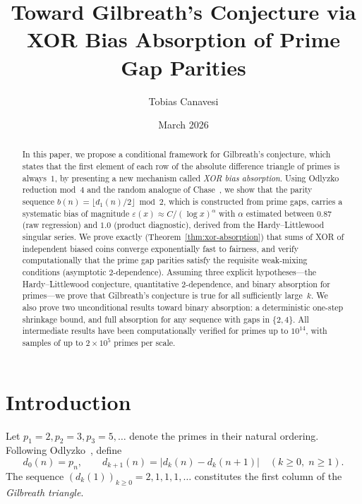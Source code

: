 \documentclass[11pt, a4paper]{amsart}
\title[Toward Gilbreath's Conjecture via XOR Bias Absorption]{%
Toward Gilbreath's Conjecture via\\ XOR Bias Absorption of Prime Gap Parities}
\author{Tobias Canavesi}
\date{March 2026}
\theoremstyle{plain}
\theoremstyle{definition}
\begin{document}
\begin{abstract}
In this paper, we propose a conditional framework for Gilbreath's conjecture, which states that the first element of each row of the absolute difference 
triangle of primes is always~$1$, by presenting a new mechanism called \emph{XOR bias absorption}. 
Using Odlyzko~\cite{Odlyzko1993} reduction mod~4 and the random analogue of Chase~\cite{Chase2020}, we show that the parity
sequence $b(n) = \lfloor d_1(n)/2 \rfloor \bmod 2$, which is constructed from prime gaps, carries a systematic bias of
magnitude $\varepsilon(x) \approx C/(\log x)^{\alpha}$ with $\alpha$ estimated between $0.87$ (raw regression)
and $1.0$ (product diagnostic), derived from the Hardy--Littlewood singular series. 
We prove exactly (Theorem~\ref{thm:xor-absorption}) that sums of XOR of independent biased coins converge exponentially fast to fairness, 
and verify computationally that the prime gap parities satisfy the requisite weak-mixing conditions (asymptotic $2$-dependence).
Assuming three explicit hypotheses---the Hardy--Littlewood conjecture, quantitative $2$-dependence, and binary absorption for primes---we
prove that Gilbreath's conjecture is true for all sufficiently large~$k$.
We also prove two unconditional results toward binary absorption: a deterministic one-step shrinkage bound,
and full absorption for any sequence with gaps in $\{2, 4\}$.
All intermediate results have been computationally verified for primes up to $10^{14}$, with samples of up to $2 \times 10^5$ primes per scale.
\end{abstract}

\maketitle

\tableofcontents

\section{Introduction}
\label{sec:intro}

Let $p_1 = 2, p_2 = 3, p_3 = 5, \ldots$ denote the primes in their natural ordering. Following Odlyzko~\cite{Odlyzko1993}, define
\begin{equation}\label{eq:gilbreath-def}
d_0(n) = p_n, \qquad d_{k+1}(n) = |d_k(n) - d_k(n+1)| \quad (k \ge 0,\; n \ge 1).
\end{equation}
The sequence $(d_k(1))_{k \ge 0} = 2, 1, 1, 1, \ldots$ constitutes the first column of the \emph{Gilbreath triangle}.
\end{document}

